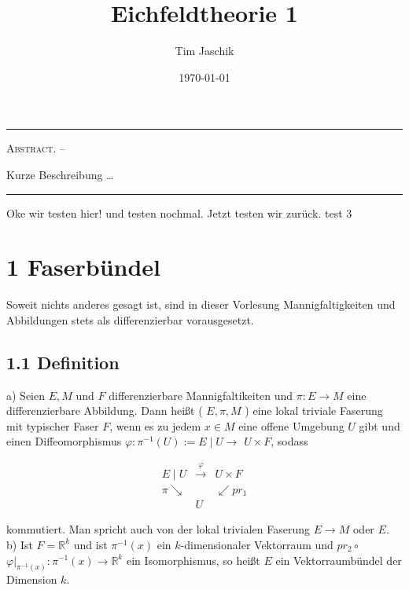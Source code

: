 \documentclass[10pt, letterpaper]{article}
\title{Eichfeldtheorie 1}
\author{Tim Jaschik}
\date{\today}
\renewenvironment{abstract}
  {
    \begin{adjustwidth}{1.5cm}{1.5cm}
    \small
    \textsc{Abstract. –}%
  }
  {
    \end{adjustwidth}
  }
\begin{document}
\maketitle
\rule{\textwidth}{0.5pt}
\begin{abstract}
Kurze Beschreibung …
\end{abstract}
\rule{\textwidth}{0.5pt}
\vspace{0.5cm}

\tableofcontents

\pagebreak


Oke wir testen hier! und testen nochmal. Jetzt testen wir zurück. test 3



\section{1 Faserbündel}
Soweit nichts anderes gesagt ist, sind in dieser Vorlesung Mannigfaltigkeiten und Abbildungen stets als differenzierbar vorausgesetzt.

\subsection*{1.1 Definition}
a) Seien $E, M$ und $F$ differenzierbare Mannigfaltikeiten und $\pi: E \rightarrow M$ eine differenzierbare Abbildung. Dann heißt ( $E, \pi, M$ ) eine lokal triviale Faserung mit typischer Faser $F$, wenn es zu jedem $x \in M$ eine offene Umgebung $U$ gibt und einen Diffeomorphismus $\varphi: \pi^{-1}(U):=E \mid U \rightarrow$ $U \times F$, sodass

$$
\begin{array}{lll}
E \mid U & \xrightarrow{\varphi} & U \times F \\
\pi \searrow & & \swarrow p r_{1} \\
& U &
\end{array}
$$

kommutiert. Man spricht auch von der lokal trivialen Faserung $E \rightarrow M$ oder $E$.\\
b) Ist $F=\mathbb{R}^{k}$ und ist $\pi^{-1}(x)$ ein $k$-dimensionaler Vektorraum und $p r_{2} \circ$ $\left.\varphi\right|_{\pi^{-1}(x)}: \pi^{-1}(x) \rightarrow \mathbb{R}^{k}$ ein Isomorphismus, so heißt $E$ ein Vektorraumbündel der Dimension $k$.
\end{document}
